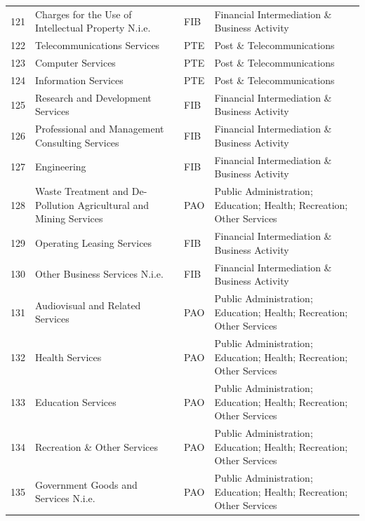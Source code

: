 \documentclass[a4paper]{article}
\begin{document}
\begin{table}[ht]
{\begin{tabular}{rlll}
  121 & Charges for the Use of Intellectual Property N.i.e. & FIB & Financial Intermediation \& Business Activity \\ 
  122 & Telecommunications Services & PTE & Post \& Telecommunications \\ 
  123 & Computer Services & PTE & Post \& Telecommunications \\ 
  124 & Information Services & PTE & Post \& Telecommunications \\ 
  125 & Research and Development Services & FIB & Financial Intermediation \& Business Activity \\ 
  126 & Professional and Management Consulting Services & FIB & Financial Intermediation \& Business Activity \\ 
  127 & Engineering & FIB & Financial Intermediation \& Business Activity \\ 
  128 & Waste Treatment and De-Pollution Agricultural and Mining Services & PAO & Public Administration; Education; Health; Recreation; Other Services \\ 
  129 & Operating Leasing Services & FIB & Financial Intermediation \& Business Activity \\ 
  130 & Other Business Services N.i.e. & FIB & Financial Intermediation \& Business Activity \\ 
  131 & Audiovisual and Related Services & PAO & Public Administration; Education; Health; Recreation; Other Services \\ 
  132 & Health Services & PAO & Public Administration; Education; Health; Recreation; Other Services \\ 
  133 & Education Services & PAO & Public Administration; Education; Health; Recreation; Other Services \\ 
  134 & Recreation \& Other Services & PAO & Public Administration; Education; Health; Recreation; Other Services \\ 
  135 & Government Goods and Services N.i.e. & PAO & Public Administration; Education; Health; Recreation; Other Services \\ 
   \bottomrule
\end{tabular}
}
\end{table}
\FloatBarrier
\end{document}
